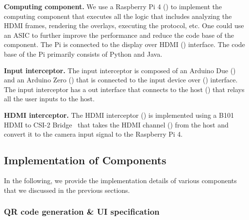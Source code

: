\begin{mylist}
 
  \item \textbf{Computing component.} We use a Raspberry Pi 4 (\six) to implement the computing component that executes all the \device logic that includes analyzing the HDMI frames, rendering the overlays, executing the \tls protocol, etc. One could use an ASIC to further improve the performance and reduce the code base of the component. The Pi is connected to the display over HDMI (\nine) interface. The code base of the Pi primarily consists of Python and Java.
  
  \item \textbf{Input interceptor.} The input interceptor is composed of an Arduino Due (\three) and an Arduino Zero (\four) that is connected to the input device over \usb (\two) interface. The input interceptor has a \usb out interface that connects to the host (\five) that relays all the user inputs to the host. 

  \item \textbf{HDMI interceptor.} The HDMI interceptor (\seven) is implemented using a B101 HDMI to CSI-2 Bridge~\cite{b101} that takes the HDMI channel (\eight) from the host and convert it to the camera input signal to the Raspberry Pi 4.  
 
\end{mylist}

\subsection{Implementation of \name Components}
\label{sec:prototype:impl}


In the following, we provide the implementation details of various \name components that we discussed in the previous sections.

\subsubsection{\bfseries QR code generation \& UI specification}
\label{sec:prototype:impl:qr}

